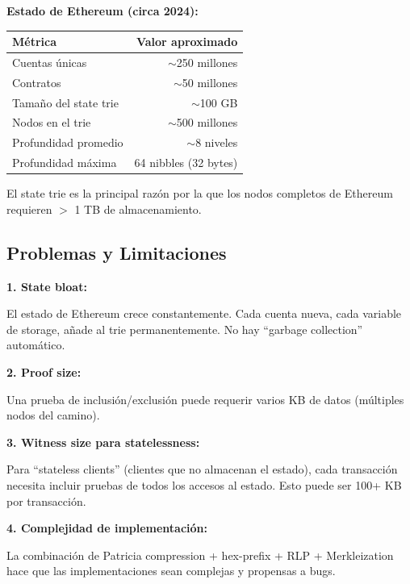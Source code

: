 \documentclass[11pt,a4paper,twoside,openright]{book}
\theoremstyle{definition}
\theoremstyle{plain}
\theoremstyle{remark}
\begin{document}
\begin{mathnote}
\textbf{Estado de Ethereum (circa 2024):}

\begin{center}
\begin{tabular}{lr}
\toprule
\textbf{Métrica} & \textbf{Valor aproximado} \\
\midrule
Cuentas únicas & $\sim$250 millones \\
Contratos & $\sim$50 millones \\
Tamaño del state trie & $\sim$100 GB \\
Nodos en el trie & $\sim$500 millones \\
Profundidad promedio & $\sim$8 niveles \\
Profundidad máxima & 64 nibbles (32 bytes) \\
\bottomrule
\end{tabular}
\end{center}

El state trie es la principal razón por la que los nodos completos de Ethereum requieren $>$ 1 TB de almacenamiento.
\end{mathnote}

\subsection{Problemas y Limitaciones}

\begin{advertencia}
\textbf{1. State bloat:}

El estado de Ethereum crece constantemente. Cada cuenta nueva, cada variable de storage, añade al trie permanentemente. No hay ``garbage collection'' automático.

\textbf{2. Proof size:}

Una prueba de inclusión/exclusión puede requerir varios KB de datos (múltiples nodos del camino).

\textbf{3. Witness size para statelessness:}

Para ``stateless clients'' (clientes que no almacenan el estado), cada transacción necesita incluir pruebas de todos los accesos al estado. Esto puede ser 100+ KB por transacción.

\textbf{4. Complejidad de implementación:}

La combinación de Patricia compression + hex-prefix + RLP + Merkleization hace que las implementaciones sean complejas y propensas a bugs.
\end{advertencia}
\end{document}
